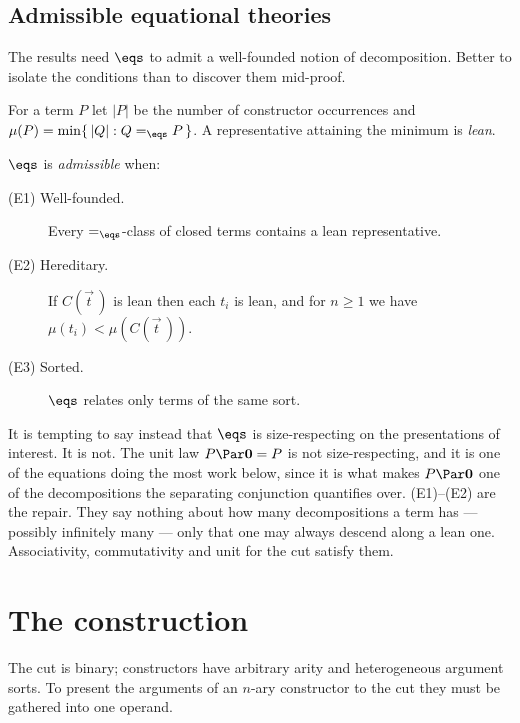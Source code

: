 \subsection{Admissible equational theories}

The results need $\eqs$ to admit a well-founded notion of decomposition. Better to
isolate the conditions than to discover them mid-proof.

\begin{definition}[Measure]
\label{ox:def:measure}
For a term $P$ let $|P|$ be the number of constructor occurrences and
$\mu(P) = \min\{\,|Q| : Q =_{\eqs} P\,\}$. A representative attaining the minimum
is \emph{lean}.
\end{definition}

\begin{definition}
\label{ox:def:adm}
$\eqs$ is \emph{admissible} when:
\begin{description}
\item[(E1) Well-founded.] Every $=_{\eqs}$-class of closed terms contains a lean
representative.
\item[(E2) Hereditary.] If $C(\vec t\,)$ is lean then each $t_i$ is lean, and for
$n \ge 1$ we have $\mu(t_i) < \mu(C(\vec t\,))$.
\item[(E3) Sorted.] $\eqs$ relates only terms of the same sort.
\end{description}
\end{definition}

\begin{remark}
\label{ox:rem:unit}
It is tempting to say instead that $\eqs$ is size-respecting on the presentations
of interest. It is not. The unit law $P \Par \mathbf{0} = P$ is not size-respecting,
and it is one of the equations doing the most work below, since it is what makes
$P \Par \mathbf{0}$ one of the decompositions the separating conjunction quantifies
over. (E1)--(E2) are the repair. They say nothing about how many decompositions a
term has --- possibly infinitely many --- only that one may always descend along a
lean one. Associativity, commutativity and unit for the cut satisfy them.
\end{remark}

\section{The construction}
\label{ox:sec:construction}

The cut is binary; constructors have arbitrary arity and heterogeneous argument
sorts. To present the arguments of an $n$-ary constructor to the cut they must be
gathered into one operand.

